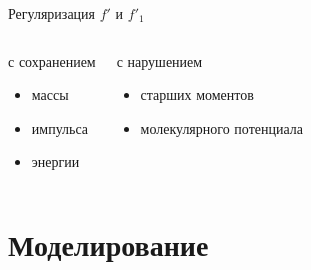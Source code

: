 \documentclass[ucs]{beamer}
\begin{document}
\begin{frame}
\begin{columns}
\begin{column}{6cm}
\begin{center}
			\end{center}
		\end{column}
	\end{columns}
	\pause[3]
	\bigskip\centering \alert{Регуляризация \(f'\) и \(f'_1\)}
	\begin{columns}
		\begin{block}{\centering с сохранением}
			\begin{itemize}
				\item массы \\
				\item импульса \\
				\item энергии \\
			\end{itemize}
		\end{block}
		\begin{block}{\centering с нарушением}
			\begin{itemize}
				\item старших моментов \\
				\item молекулярного потенциала \\
			\end{itemize}
		\end{block}
	\end{columns}

\end{frame}

\section{Моделирование}
\end{document}
